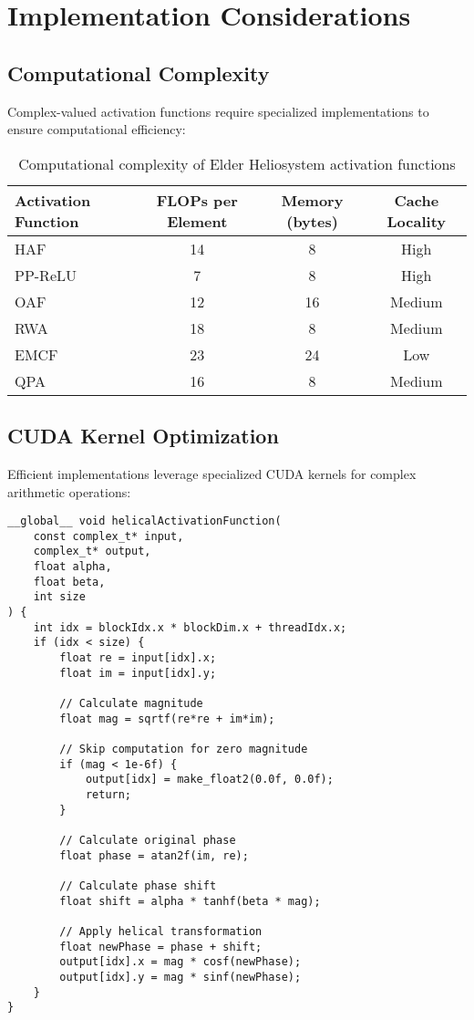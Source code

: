 \section{Implementation Considerations}

\subsection{Computational Complexity}

Complex-valued activation functions require specialized implementations to ensure computational efficiency:

\begin{table}[h]
\centering
\begin{tabular}{|l|c|c|c|}
\hline
\textbf{Activation Function} & \textbf{FLOPs per Element} & \textbf{Memory (bytes)} & \textbf{Cache Locality} \\
\hline
HAF & 14 & 8 & High \\
PP-ReLU & 7 & 8 & High \\
OAF & 12 & 16 & Medium \\
RWA & 18 & 8 & Medium \\
EMCF & 23 & 24 & Low \\
QPA & 16 & 8 & Medium \\
\hline
\end{tabular}
\caption{Computational complexity of Elder Heliosystem activation functions}
\end{table}

\subsection{CUDA Kernel Optimization}

Efficient implementations leverage specialized CUDA kernels for complex arithmetic operations:

\begin{tcolorbox}[colback=CodeBackground, colframe=DarkGray, title=Optimized CUDA Implementation of HAF, fonttitle=\bfseries]
\begin{verbatim}
__global__ void helicalActivationFunction(
    const complex_t* input,
    complex_t* output,
    float alpha,
    float beta,
    int size
) {
    int idx = blockIdx.x * blockDim.x + threadIdx.x;
    if (idx < size) {
        float re = input[idx].x;
        float im = input[idx].y;
        
        // Calculate magnitude
        float mag = sqrtf(re*re + im*im);
        
        // Skip computation for zero magnitude
        if (mag < 1e-6f) {
            output[idx] = make_float2(0.0f, 0.0f);
            return;
        }
        
        // Calculate original phase
        float phase = atan2f(im, re);
        
        // Calculate phase shift
        float shift = alpha * tanhf(beta * mag);
        
        // Apply helical transformation
        float newPhase = phase + shift;
        output[idx].x = mag * cosf(newPhase);
        output[idx].y = mag * sinf(newPhase);
    }
}
\end{verbatim}
\end{tcolorbox}

